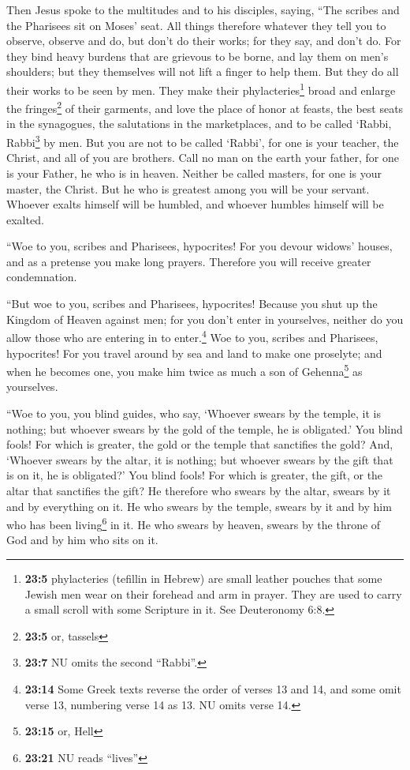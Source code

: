  Then Jesus spoke to the multitudes and to his disciples,
 saying, ``The scribes and the Pharisees sit on Moses'
seat.  All things therefore whatever they tell you to
observe, observe and do, but don't do their works; for they say, and
don't do.  For they bind heavy burdens that are grievous
to be borne, and lay them on men's shoulders; but they themselves will
not lift a finger to help them.  But they do all their
works to be seen by men. They make their phylacteries\footnote{\textbf{23:5}
  phylacteries (tefillin in Hebrew) are small leather pouches that some
  Jewish men wear on their forehead and arm in prayer. They are used to
  carry a small scroll with some Scripture in it. See Deuteronomy 6:8.}
broad and enlarge the fringes\footnote{\textbf{23:5} or, tassels} of
their garments,  and love the place of honor at feasts,
the best seats in the synagogues,  the salutations in the
marketplaces, and to be called `Rabbi, Rabbi\footnote{\textbf{23:7} NU
  omits the second ``Rabbi''.} by men.  But you are not to
be called `Rabbi', for one is your teacher, the Christ, and all of you
are brothers.  Call no man on the earth your father, for
one is your Father, he who is in heaven.  Neither be
called masters, for one is your master, the Christ.  But
he who is greatest among you will be your servant. 
Whoever exalts himself will be humbled, and whoever humbles himself will
be exalted.

 ``Woe to you, scribes and Pharisees, hypocrites! For you
devour widows' houses, and as a pretense you make long prayers.
Therefore you will receive greater condemnation.

 ``But woe to you, scribes and Pharisees, hypocrites!
Because you shut up the Kingdom of Heaven against men; for you don't
enter in yourselves, neither do you allow those who are entering in to
enter.\footnote{\textbf{23:14} Some Greek texts reverse the order of
  verses 13 and 14, and some omit verse 13, numbering verse 14 as 13. NU
  omits verse 14.}  Woe to you, scribes and Pharisees,
hypocrites! For you travel around by sea and land to make one proselyte;
and when he becomes one, you make him twice as much a son of
Gehenna\footnote{\textbf{23:15} or, Hell} as yourselves.

 ``Woe to you, you blind guides, who say, `Whoever swears
by the temple, it is nothing; but whoever swears by the gold of the
temple, he is obligated.'  You blind fools! For which is
greater, the gold or the temple that sanctifies the gold?
 And, `Whoever swears by the altar, it is nothing; but
whoever swears by the gift that is on it, he is obligated?'
 You blind fools! For which is greater, the gift, or the
altar that sanctifies the gift?  He therefore who swears
by the altar, swears by it and by everything on it.  He
who swears by the temple, swears by it and by him who has been
living\footnote{\textbf{23:21} NU reads ``lives''} in it.
 He who swears by heaven, swears by the throne of God and
by him who sits on it.

